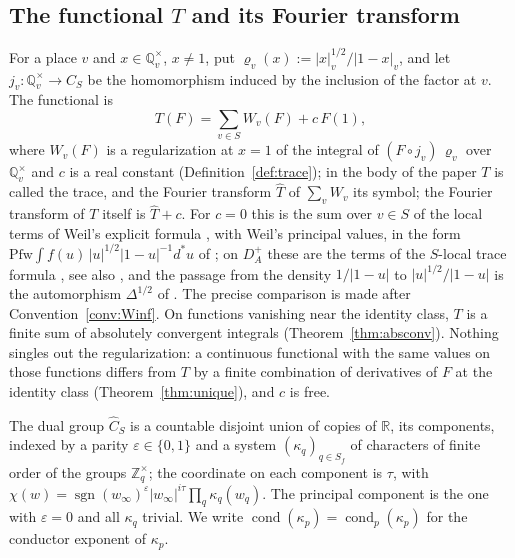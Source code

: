 \documentclass[11pt]{amsart}
\theoremstyle{definition}
\theoremstyle{remark}
\newcommand{\R}{\mathbb R}
\newcommand{\Z}{\mathbb Z}
\newcommand{\Q}{\mathbb Q}
\newcommand{\sgn}{\operatorname{sgn}}
\newcommand{\cond}{\operatorname{cond}}
\begin{document}
\subsection*{The functional $T$ and its Fourier transform}

For a place $v$ and $x\in\Q_v^{\times}$, $x\ne1$, put
$\varrho_v(x):=|x|_v^{1/2}/|1-x|_v$, and let $j_v:\Q_v^{\times}\to C_S$ be the
homomorphism induced by the inclusion of the factor at $v$.  The functional
is
\[
T(F)=\sum_{v\in S}W_v(F)+c\,F(1),
\]
where $W_v(F)$ is a regularization at $x=1$ of the integral of
$(F\circ j_v)\,\varrho_v$ over $\Q_v^{\times}$ and $c$ is a real constant
(Definition~\ref{def:trace}); in the body of the paper $T$ is called the
trace, and the Fourier transform $\widehat T$ of $\sum_vW_v$ its symbol; the
Fourier transform of $T$ itself is $\widehat T+c$.  For $c=0$ this is the sum over $v\in S$ of the
local terms of Weil's explicit formula \cite{Weil1952}, with Weil's
principal values, in the form
$\mathrm{Pfw}\!\int f(u)\,|u|^{1/2}|1-u|^{-1}d^{*}u$ of
\cite[Appendix~II]{Connes99}; on $D_A^{+}$ these are the terms of the
$S$-local trace formula \cite[Theorem~4]{Connes99}, see also
\cite[Section~3]{MeyerIdele}, and the passage from the density
$1/|1-u|$ to $|u|^{1/2}/|1-u|$ is the automorphism $\Delta^{1/2}$ of
\cite[Introduction]{CCWeilArch}.  The precise comparison is made after
Convention~\ref{conv:Winf}.  On functions vanishing near the identity class,
$T$ is a finite sum of absolutely convergent integrals
(Theorem~\ref{thm:absconv}).  Nothing singles out the regularization: a
continuous functional with the same values on those functions differs from
$T$ by a finite combination of derivatives of $F$ at the identity class
(Theorem~\ref{thm:unique}), and $c$ is free.

The dual group $\widehat C_S$ is a countable disjoint union of copies of
$\R$, its components, indexed by a parity $\varepsilon\in\{0,1\}$ and a system
$(\kappa_q)_{q\in S_f}$ of characters of finite order of the groups
$\Z_q^{\times}$; the coordinate on each component is $\tau$, with
$\chi(w)=\sgn(w_{\infty})^{\varepsilon}|w_{\infty}|^{i\tau}\prod_q\kappa_q(w_q)$.
The principal component is the one with $\varepsilon=0$ and all $\kappa_q$
trivial.  We write $\cond(\kappa_p)=\cond_p(\kappa_p)$ for the conductor exponent of
$\kappa_p$.
\end{document}

